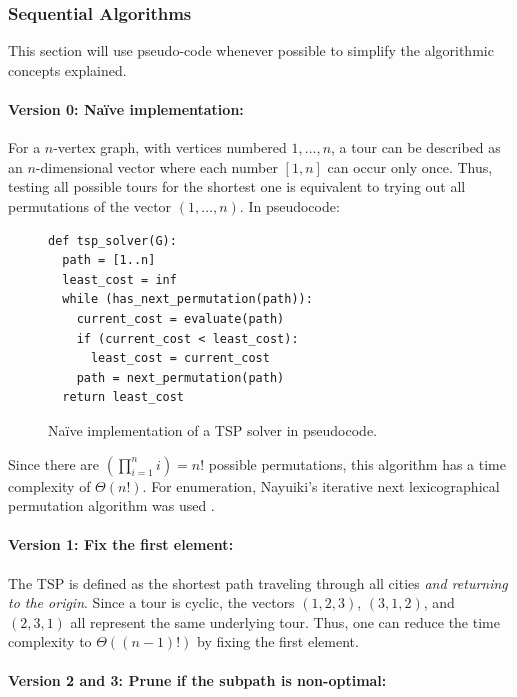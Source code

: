 \subsubsection{Sequential Algorithms}
This section will use pseudo-code whenever possible to simplify the algorithmic concepts explained.

\paragraph{Version 0: Na\"ive implementation:}

For a $n$-vertex graph, with vertices numbered $1,\dots,n$, a tour can be described as an $n$-dimensional vector where each number $[1,n]$ can occur only once. Thus, testing all possible tours for the shortest one is equivalent to trying out all permutations of the vector $(1,\dots,n)$. In pseudocode:

\begin{figure}[H]
\begin{verbatim}
def tsp_solver(G):
  path = [1..n]
  least_cost = inf
  while (has_next_permutation(path)):
    current_cost = evaluate(path)
    if (current_cost < least_cost):
      least_cost = current_cost
    path = next_permutation(path)
  return least_cost
\end{verbatim}
\caption{Na\"ive implementation of a \ac{TSP} solver in pseudocode.}
\end{figure}

Since there are $(\prod_{i=1}^n i) = n!$ possible permutations, this algorithm has a time complexity of $\Theta(n!)$. For enumeration, Nayuiki's iterative next lexicographical permutation algorithm was used \cite{nayuki_next_2018}.

\paragraph{Version 1: Fix the first element:}

The \ac{TSP} is defined as the shortest path traveling through all cities \emph{and returning to the origin}. Since a tour is cyclic, the vectors $(1,2,3)$, $(3,1,2)$, and $(2,3,1)$ all represent the same underlying tour. Thus, one can reduce the time complexity to $\Theta((n-1)!)$ by fixing the first element.

\paragraph{Version 2 and 3: Prune if the subpath is non-optimal:}

